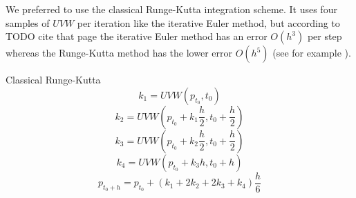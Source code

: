 We preferred to use the classical Runge-Kutta integration scheme. It uses four samples of $UVW$ per iteration like the iterative Euler method, but according to {TODO cite that page} the iterative Euler method has an error $O(h^3)$ per step whereas the Runge-Kutta method has the lower error $O(h^5)$ (see for example \cite{src:numerical_recipes}).

Classical Runge-Kutta
\begin{equation}
	k_1 = UVW(p_{t_0}, t_0)
\end{equation}
\begin{equation}
	k_2 = UVW(p_{t_0} + k_1 \frac{h}{2}, t_0 + \frac{h}{2})
\end{equation}
\begin{equation}
	k_3 = UVW(p_{t_0} + k_2 \frac{h}{2}, t_0 + \frac{h}{2})
\end{equation}
\begin{equation}
	k_4 = UVW(p_{t_0} + k_3 h, t_0 + h)
\end{equation}
\begin{equation}
	p_{t_0 + h} = p_{t_0} + (k_1 + 2 k_2 + 2 k_3 + k_4) \frac{h}{6}
\end{equation}

